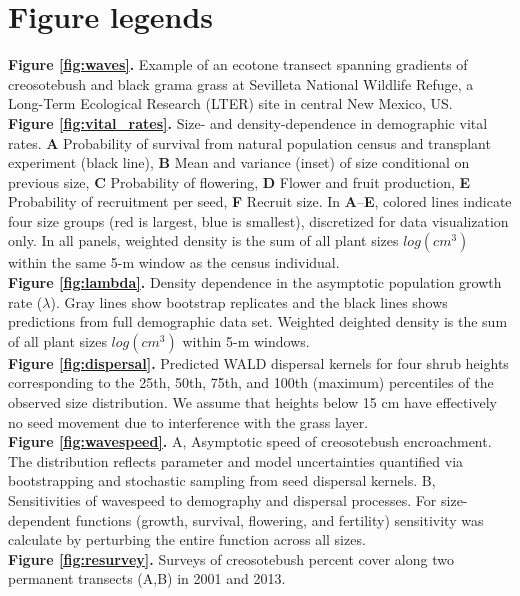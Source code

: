 \documentclass[11pt]{article}\usepackage[]{graphicx}\usepackage[]{color}
\begin{document}



\newpage
\section*{Figure legends}
\noindent{} \textbf{Figure \ref{fig:waves}.} Example of an ecotone transect spanning gradients of creosotebush and black grama grass at Sevilleta National Wildlife Refuge, a Long-Term Ecological Research (LTER) site in central New Mexico, US.
\\
\noindent{} \textbf{Figure \ref{fig:vital_rates}.} Size- and density-dependence in demographic vital rates. \textbf{A} Probability of survival from natural population census and transplant experiment (black line), \textbf{B} Mean and variance (inset) of size conditional on previous size, \textbf{C} Probability of flowering, \textbf{D} Flower and fruit production, \textbf{E} Probability of recruitment per seed, \textbf{F} Recruit size.  In \textbf{A}--\textbf{E}, colored lines indicate four size groups (red is largest, blue is smallest), discretized for data visualization only. In all panels, weighted density is the sum of all plant sizes $log(cm^3)$ within the same 5-m window as the census individual.
\\
\noindent{} \textbf{Figure \ref{fig:lambda}.} Density dependence in the asymptotic population growth rate ($\lambda$). Gray lines show bootstrap replicates and the black lines shows predictions from full demographic data set. Weighted deighted density is the sum of all plant sizes $log(cm^3)$ within 5-m windows.
\\
\noindent{} \textbf{Figure \ref{fig:dispersal}.} Predicted WALD dispersal kernels for four shrub heights corresponding to the 25th, 50th, 75th, and 100th (maximum) percentiles of the observed size distribution. We assume that heights below 15 cm have effectively no seed movement due to interference with the grass layer.
\\
\noindent{} \textbf{Figure \ref{fig:wavespeed}.} A, Asymptotic speed of creosotebush encroachment. The distribution reflects parameter and model uncertainties quantified via bootstrapping and stochastic sampling from seed dispersal kernels. B, Sensitivities of wavespeed to demography and dispersal processes. For size-dependent functions (growth, survival, flowering, and fertility) sensitivity was calculate by perturbing the entire function across all sizes.
\\
\noindent{} \textbf{Figure \ref{fig:resurvey}.} Surveys of creosotebush percent cover along two permanent transects (A,B) in 2001 and 2013.
\end{document}
